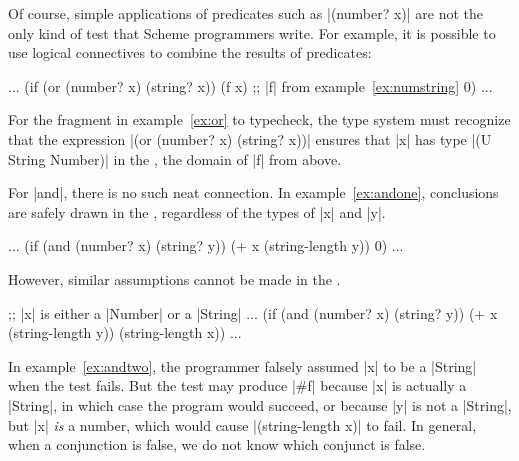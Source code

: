 \begin{schemeregion}
Of course, simple applications of predicates such as \scheme|(number?
x)| are not the only kind of test that Scheme programmers write.  For
example, it is possible to use logical connectives to combine the
results of predicates:

\begin{exmp} 
\begin{schemedisplay}
... (if (or (number? x) (string? x))
        (f x) ;; \scheme|f| from example~\ref{ex:numstring}
        0) ...
\end{schemedisplay}
\label{ex:or}
\end{exmp}

\noindent
For the fragment in example~\ref{ex:or}
 to typecheck, the type system must recognize that the expression 
\scheme|(or (number? x) (string? x))| ensures that \scheme|x| has
type \scheme|(U String Number)| in the \tbranch, the domain of \scheme|f| from above.

For \scheme|and|, there is no such neat connection.  In
example~\ref{ex:andone}, conclusions are safely drawn in the \tbranch,
regardless of the types of \scheme|x| and \scheme|y|.
\begin{exmp}
\begin{schemedisplay}
... (if (and (number? x) (string? y))
        (+ x (string-length y))
        0) ...
\end{schemedisplay}
  \label{ex:andone}
\end{exmp}
\noindent

However, similar assumptions cannot be made in the \ebranch.

\begin{exmp}
\begin{schemedisplay}
;; \scheme|x| is either a \scheme|Number| or a \scheme|String|
... (if (and (number? x) (string? y))
        (+ x (string-length y))
        (string-length x)) ...
\end{schemedisplay}
\label{ex:andtwo}
\end{exmp}
\label{sec:andintro}
\noindent
In example~\ref{ex:andtwo}, the programmer falsely assumed
 \scheme|x| to be a \scheme|String|
when the test fails.
But the test may produce \scheme|#f|
 because \scheme|x| is actually a \scheme|String|, in which case
the program would succeed, or because \scheme|y| is not a
\scheme|String|, but \scheme|x| \emph{is} a number, which would cause
 \scheme|(string-length x)| to fail.  In general, when
a conjunction is false, we do not know which conjunct is false.


\end{schemeregion}

